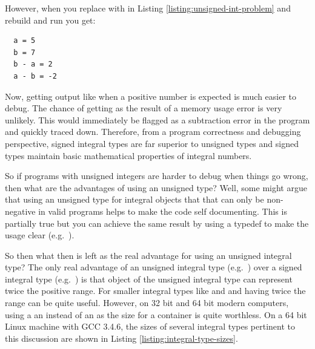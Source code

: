 \documentclass[pdf,ps2pdf,11pt]{SANDreport}
\begin{document}
However, when you replace {} with {} in Listing {}\ref{listing:unsigned-int-problem} and rebuild and
run you get:


{\small\begin{verbatim}
  a = 5
  b = 7
  b - a = 2
  a - b = -2
\end{verbatim}}


Now, getting output like {} when a positive number is expected
is much easier to debug.  The chance of getting {} as the
result of a memory usage error is very unlikely.  This would
immediately be flagged as a subtraction error in the program and
quickly traced down.  Therefore, from a program correctness and
debugging perspective, signed integral types are far superior to
unsigned types and signed types maintain basic mathematical properties
of integral numbers.

So if programs with unsigned integers are harder to debug when things
go wrong, then what are the advantages of using an unsigned type?
Well, some might argue that using an unsigned type for integral
objects that that can only be non-negative in valid programs helps to
make the code self documenting.  This is partially true but you can
achieve the same result by using a typedef to make the usage clear
(e.g.\ {}).

So then what then is left as the real advantage for using an unsigned
integral type?  The only real advantage of an unsigned integral type
(e.g.\ {}) over a signed integral type (e.g.\
{}) is that object of the unsigned integral type can
represent twice the positive range.  For smaller integral types like
{}\ttt{char} and and {}\ttt{short int} having twice the range can be
quite useful.  However, on 32 bit and 64 bit modern computers, using a
an {}\ttt{unsigned int} instead of an {}\ttt{int} as the size for a
container is quite worthless.  On a 64 bit Linux machine with GCC
3.4.6, the sizes of several integral types pertinent to this
discussion are shown in Listing {}\ref{listing:integral-type-sizes}.
\end{document}
